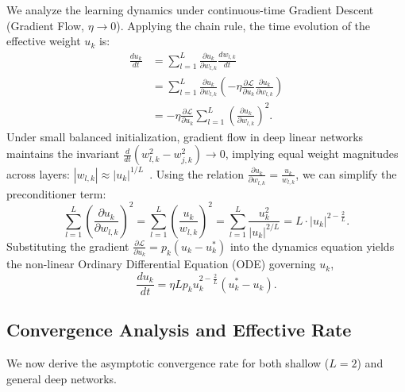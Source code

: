 \documentclass{article}
\theoremstyle{plain}
\theoremstyle{definition}
\theoremstyle{remark}
\begin{document}
We analyze the learning dynamics under continuous-time Gradient Descent (Gradient Flow, $\eta \to 0$). Applying the chain rule, the time evolution of the effective weight $u_k$ is:
\begin{align*}
    \frac{d u_k}{dt} &= \sum_{l=1}^L \frac{\partial u_k}{\partial w_{l,k}} \frac{d w_{l,k}}{dt} \nonumber \\
    &= \sum_{l=1}^L \frac{\partial u_k}{\partial w_{l,k}} \left( - \eta \frac{\partial \mathcal{L}}{\partial u_k} \frac{\partial u_k}{\partial w_{l,k}} \right) \nonumber \\
    &= - \eta \frac{\partial \mathcal{L}}{\partial u_k} \sum_{l=1}^L \left( \frac{\partial u_k}{\partial w_{l,k}} \right)^2.
\end{align*}
Under small balanced initialization, gradient flow in deep linear networks maintains the invariant $\frac{d}{dt}(w_{l,k}^2 - w_{j,k}^2) \to 0$, implying equal weight magnitudes across layers: $|w_{l,k}| \approx |u_k|^{1/L}$~\citep{arora2018optimization}. 
Using the relation $\frac{\partial u_k}{\partial w_{l,k}} = \frac{u_k}{w_{l,k}}$, we can simplify the preconditioner term:
\begin{equation*}
    \sum_{l=1}^L \left( \frac{\partial u_k}{\partial w_{l,k}} \right)^2 = \sum_{l=1}^L \left( \frac{u_k}{w_{l,k}} \right)^2 = \sum_{l=1}^L \frac{u_k^2}{|u_k|^{2/L}} = L \cdot |u_k|^{2 - \frac{2}{L}}.
\end{equation*}
Substituting the gradient $\frac{\partial \mathcal{L}}{\partial u_k} = p_k(u_k - u_k^*)$ into the dynamics equation yields the non-linear Ordinary Differential Equation (ODE) governing $u_k$,
\begin{equation}
    \label{eq:ode_general}
    \frac{d u_k}{dt} = \eta L p_k u_k^{2 - \frac{2}{L}} (u_k^* - u_k).
\end{equation}

\subsection{Convergence Analysis and Effective Rate}
We now derive the asymptotic convergence rate for both shallow ($L=2$) and general deep networks.
\end{document}
